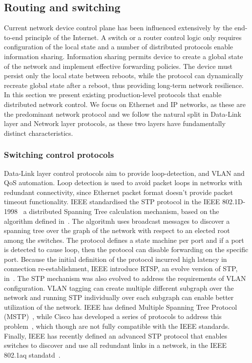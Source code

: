 \subsection{Routing and switching}

Current network device control plane has been influenced extensively by the
end-to-end principle of the Internet. A switch or a router control logic only
requires configuration of the local state and a number of distributed protocols
enable information sharing. Information sharing permits device to create
a global state of the network and implement effective forwarding policies. The
device must persist only the local state between reboots, while the protocol can
dynamically recreate global state after a reboot, thus providing long-term
network resilience.  In this section we present existing production-level protocols that
enable distributed network control. We focus on Ethernet and IP networks, as
these are the predominant network protocol and we follow the natural split in
Data-Link layer and Network layer protocols, as these two layers have fundamentally
distinct characteristics.

\subsubsection{Switching control protocols}

Data-Link layer control protocols aim to provide loop-detection, and VLAN and
QoS automation. Loop detection is used to avoid packet loops in networks with
redundant connectivity, since Ethernet packet format doesn't provide packet timeout
functionality. IEEE standardised the STP protocol in the IEEE 
802.1D-1998~\cite{ieee_802_1d} a distributed Spanning Tree calculation
mechanism, based on the algorithm defined in~\cite{Perlman1985}. The algoritmh
uses broadcast messages to discover a spanning tree over the graph of the
network with respect to an elected root among the switches. The protocol defines
a state machine per port and if a port is detected to cause loop, then the
protocol can disable forwarding on the specific port.  Because the initial
definition of the protocol incurred high latency in connection re-establishment,
IEEE introduce RTSP, an evolve version of STP, in~\cite{ieee_802_1d_2004}.
The STP mechanism was also evolved to address the requirements of VLAN
configuration. VLAN tagging can create multiple different subgraph over the
network and running STP individually over each subgraph can enable better
utilization of the network. IEEE has defined  Multiple Spanning Tree Protocol
(MSTP)~\cite{ieee_802_1q}, while Cisco has developed a series of
protocols to address this problem~\cite{pvst,pvst+}, which though are not fully
compatible with the IEEE standards.
Finally, IEEE has recently defined an advanced STP protocol that enables
switches to discover and use all redundant links in a network, in the IEEE 802.1aq
standatd~\cite{ieee_802_1aq}.

